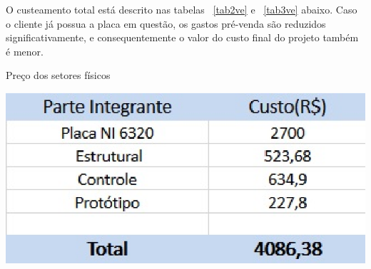 O custeamento total está descrito nas tabelas ~\ref{tab2ve} e ~\ref{tab3ve} abaixo. Caso o cliente já possua a placa em questão, os gastos pré-venda são reduzidos significativamente, e consequentemente o valor do custo final do projeto também é menor.\\ 
\begin{table}[!htb]
	\centering
	\caption{Preço dos setores físicos}\label{tab2ve}
	\includegraphics[scale=1]{figuras/figura2ve.eps}
\end{table}
